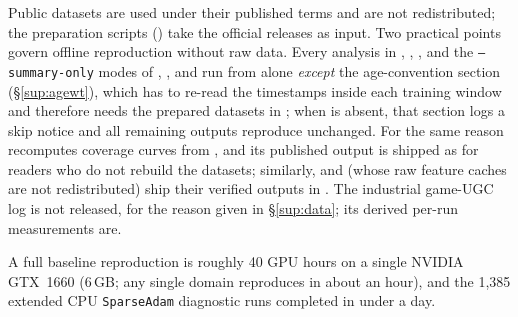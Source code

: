 \documentclass[10pt,letterpaper]{article}
\begin{document}
Public datasets are used under their published terms and are not
redistributed; the preparation scripts () take the
official releases as input. Two practical points govern offline reproduction
without raw data. Every analysis in ,
, , and the
\texttt{--summary-only} modes of ,
, and  run
from  alone \emph{except}
the age-convention section (\S\ref{sup:agewt}), which has to re-read the
timestamps inside each training window and therefore needs the prepared
datasets in ; when  is absent, that section logs a
skip notice and all remaining outputs reproduce unchanged. For the same reason
 recomputes coverage curves from
, and its published output is shipped as
 for readers who do not rebuild the
datasets; similarly,  and
 (whose raw feature caches are not
redistributed) ship their verified outputs in . The industrial
game-UGC log is not released, for the reason given in \S\ref{sup:data}; its
derived per-run measurements are.

A full baseline reproduction is roughly 40 GPU hours on a single NVIDIA
GTX~1660 (6\,GB; any single domain reproduces in about an hour), and the
1,385 extended CPU \texttt{SparseAdam} diagnostic runs completed in under a day.
\end{document}

